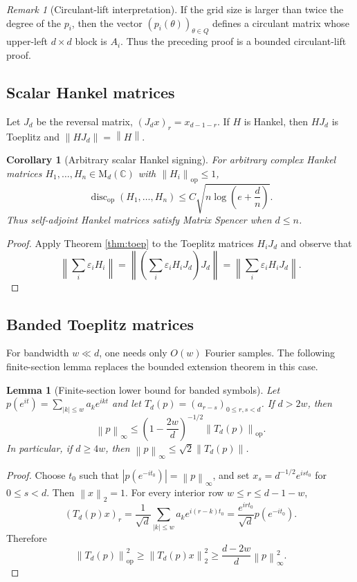 \documentclass[11pt]{amsart}
\numberwithin{equation}{section}
\newtheorem{corollary}[theorem]{Corollary}
\newtheorem{lemma}[theorem]{Lemma}
\theoremstyle{definition}
\theoremstyle{remark}
\newtheorem{remark}[theorem]{Remark}
\newcommand{\C}{\mathbb C}
\newcommand{\M}{\mathrm M}
\newcommand{\op}{\mathrm{op}}
\newcommand{\discop}{\operatorname{disc}_{\op}}
\newcommand{\norm}[1]{\left\lVert #1\right\rVert}
\newcommand{\eps}{\varepsilon}
\begin{document}
\begin{remark}[Circulant-lift interpretation]
If the grid size is larger than twice the degree of the $p_i$, then the vector
$(p_i(\theta))_{\theta\in Q}$ defines a circulant matrix whose upper-left
$d\times d$ block is $A_i$. Thus the preceding proof is a bounded
circulant-lift proof.
\end{remark}

\subsection{Scalar Hankel matrices}

Let $J_d$ be the reversal matrix, $(J_dx)_r=x_{d-1-r}$. If $H$ is Hankel, then
$HJ_d$ is Toeplitz and $\norm{HJ_d}=\norm H$.

\begin{corollary}[Arbitrary scalar Hankel signing]\label{cor:hankel}
For arbitrary complex Hankel matrices $H_1,\ldots,H_n\in\M_d(\C)$ with
$\norm{H_i}_{\op}\le 1$,
\[
\discop(H_1,\ldots,H_n)
\le C\sqrt{n\log\left(e+\frac{d}{n}\right)} .
\]
Thus self-adjoint Hankel matrices satisfy Matrix Spencer when $d\le n$.
\end{corollary}

\begin{proof}
Apply Theorem \ref{thm:toep} to the Toeplitz matrices $H_iJ_d$ and
observe that
\[
\norm{\sum_i\eps_iH_i}
=\norm{\left(\sum_i\eps_iH_iJ_d\right)J_d}
=\norm{\sum_i\eps_iH_iJ_d} .
\]
\end{proof}

\subsection{Banded Toeplitz matrices}

For bandwidth $w\ll d$, one needs only $O(w)$ Fourier samples. The following
finite-section lemma replaces the bounded extension theorem in this case.

\begin{lemma}[Finite-section lower bound for banded symbols]\label{lem:band}
Let $p(e^{it})=\sum_{|k|\le w}a_ke^{ikt}$ and let
$T_d(p)=(a_{r-s})_{0\le r,s<d}$. If $d>2w$, then
\[
\norm{p}_{\infty}
\le \left(1-\frac{2w}{d}\right)^{-1/2}\norm{T_d(p)}_{\op} .
\]
In particular, if $d\ge 4w$, then $\norm{p}_{\infty}\le \sqrt2\norm{T_d(p)}$.
\end{lemma}

\begin{proof}
Choose $t_0$ such that $|p(e^{-it_0})|=\norm p_\infty$, and set
$x_s=d^{-1/2}e^{is t_0}$ for $0\le s<d$. Then $\norm x_2=1$. For every
interior row $w\le r\le d-1-w$,
\[
(T_d(p)x)_r
= \frac{1}{\sqrt d}\sum_{|k|\le w} a_k e^{i(r-k)t_0}
= \frac{e^{ir t_0}}{\sqrt d}p(e^{-it_0}).
\]
Therefore
\[
\norm{T_d(p)}_{\op}^2
\ge \norm{T_d(p)x}_2^2
\ge \frac{d-2w}{d}\norm p_\infty^2 .
\]
\end{proof}
\end{document}
